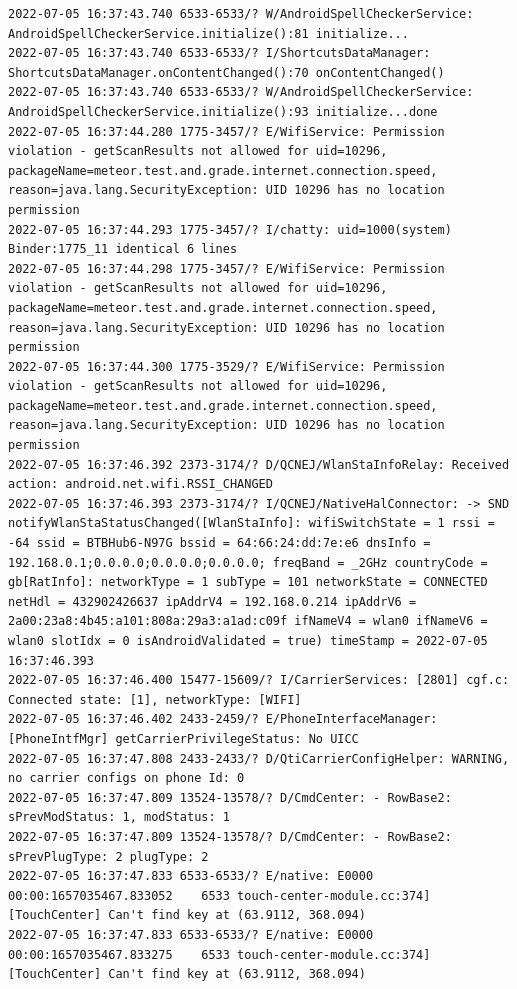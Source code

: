 \documentclass[a4paper,12pt]{book}
\begin{document}
\begin{lstlisting}
2022-07-05 16:37:43.740 6533-6533/? W/AndroidSpellCheckerService: AndroidSpellCheckerService.initialize():81 initialize...
2022-07-05 16:37:43.740 6533-6533/? I/ShortcutsDataManager: ShortcutsDataManager.onContentChanged():70 onContentChanged()
2022-07-05 16:37:43.740 6533-6533/? W/AndroidSpellCheckerService: AndroidSpellCheckerService.initialize():93 initialize...done
2022-07-05 16:37:44.280 1775-3457/? E/WifiService: Permission violation - getScanResults not allowed for uid=10296, packageName=meteor.test.and.grade.internet.connection.speed, reason=java.lang.SecurityException: UID 10296 has no location permission
2022-07-05 16:37:44.293 1775-3457/? I/chatty: uid=1000(system) Binder:1775_11 identical 6 lines
2022-07-05 16:37:44.298 1775-3457/? E/WifiService: Permission violation - getScanResults not allowed for uid=10296, packageName=meteor.test.and.grade.internet.connection.speed, reason=java.lang.SecurityException: UID 10296 has no location permission
2022-07-05 16:37:44.300 1775-3529/? E/WifiService: Permission violation - getScanResults not allowed for uid=10296, packageName=meteor.test.and.grade.internet.connection.speed, reason=java.lang.SecurityException: UID 10296 has no location permission
2022-07-05 16:37:46.392 2373-3174/? D/QCNEJ/WlanStaInfoRelay: Received action: android.net.wifi.RSSI_CHANGED
2022-07-05 16:37:46.393 2373-3174/? I/QCNEJ/NativeHalConnector: -> SND notifyWlanStaStatusChanged([WlanStaInfo]: wifiSwitchState = 1 rssi = -64 ssid = BTBHub6-N97G bssid = 64:66:24:dd:7e:e6 dnsInfo = 192.168.0.1;0.0.0.0;0.0.0.0;0.0.0.0; freqBand = _2GHz countryCode = gb[RatInfo]: networkType = 1 subType = 101 networkState = CONNECTED netHdl = 432902426637 ipAddrV4 = 192.168.0.214 ipAddrV6 = 2a00:23a8:4b45:a101:808a:29a3:a1ad:c09f ifNameV4 = wlan0 ifNameV6 = wlan0 slotIdx = 0 isAndroidValidated = true) timeStamp = 2022-07-05 16:37:46.393
2022-07-05 16:37:46.400 15477-15609/? I/CarrierServices: [2801] cgf.c: Connected state: [1], networkType: [WIFI]
2022-07-05 16:37:46.402 2433-2459/? E/PhoneInterfaceManager: [PhoneIntfMgr] getCarrierPrivilegeStatus: No UICC
2022-07-05 16:37:47.808 2433-2433/? D/QtiCarrierConfigHelper: WARNING, no carrier configs on phone Id: 0
2022-07-05 16:37:47.809 13524-13578/? D/CmdCenter: - RowBase2: sPrevModStatus: 1, modStatus: 1
2022-07-05 16:37:47.809 13524-13578/? D/CmdCenter: - RowBase2: sPrevPlugType: 2 plugType: 2
2022-07-05 16:37:47.833 6533-6533/? E/native: E0000 00:00:1657035467.833052    6533 touch-center-module.cc:374] [TouchCenter] Can't find key at (63.9112, 368.094)
2022-07-05 16:37:47.833 6533-6533/? E/native: E0000 00:00:1657035467.833275    6533 touch-center-module.cc:374] [TouchCenter] Can't find key at (63.9112, 368.094)

\end{lstlisting}
\end{document}
